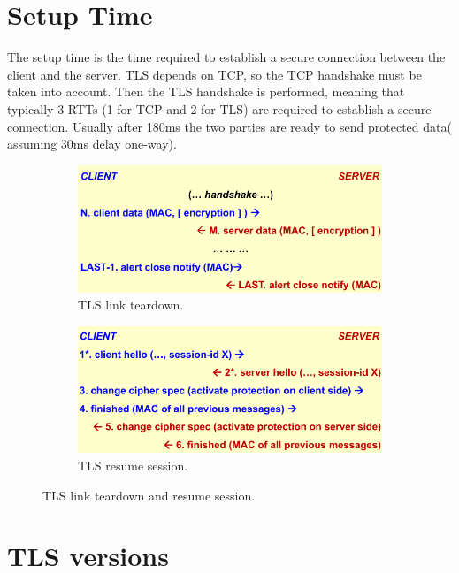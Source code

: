 \section{Setup Time}
The setup time is the time required to establish a secure connection 
between the client and the server. TLS depends on TCP, so the TCP
handshake must be taken into account. Then the TLS handshake is
performed, meaning that typically 3 RTTs (1 for TCP and 2 for TLS) are
required to establish a secure connection. Usually after 180ms the two
parties are ready to send protected data( assuming 30ms delay
one-way).

\begin{figure}[H]
  \centering
  \begin{subfigure}{.5\textwidth}
    \centering
    \includegraphics[width=.9\linewidth]{img/TLS link teardown.png}
    \caption{TLS link teardown.}  
    \label{fig:tls-link-teardown}
  \end{subfigure}%
  \begin{subfigure}{.5\textwidth}
    \centering
    \includegraphics[width=.9\linewidth]{img/TLS resume session.png}
    \caption{TLS resume session.}
    \label{fig:tls-resume-session}
  \end{subfigure}
  \caption{TLS link teardown and resume session.}
\end{figure}

\section{TLS versions}

